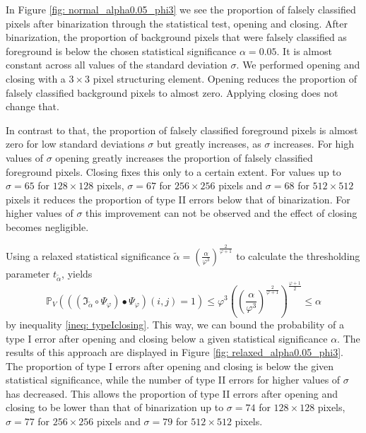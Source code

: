 \documentclass[a4paper,12pt]{article}
\theoremstyle{plain}
\theoremstyle{definition}
\begin{document}
In Figure \ref{fig: normal_alpha0.05_phi3} we see the proportion of falsely classified pixels after binarization through the statistical test, opening and closing. After binarization, the proportion of background pixels that were falsely classified as foreground is below the chosen statistical significance $\alpha = 0.05$. It is almost constant across all values of the standard deviation $\sigma$. We performed opening and closing with a $3 \times 3$ pixel structuring element. Opening reduces the proportion of falsely classified background pixels to almost zero. Applying closing does not change that.

In contrast to that, the proportion of falsely classified foreground pixels is almost zero for low standard deviations $\sigma$ but greatly increases, as $\sigma$ increases. For high values of $\sigma$ opening greatly increases the proportion of falsely classified foreground pixels. Closing fixes this only to a certain extent. For values up to $\sigma = 65$ for $128 \times 128$ pixels, $\sigma = 67$ for $256 \times 256$ pixels and $\sigma = 68$ for $512 \times 512$ pixels it reduces the proportion of type II errors below that of binarization. For higher values of $\sigma$ this improvement can not be observed and the effect of closing becomes negligible.

Using a relaxed statistical significance $\tilde{\alpha} = \left( \frac{\alpha}{\varphi^3} \right)^{\frac{2}{\varphi + 1}}$ to calculate the thresholding parameter $t_{\tilde{\alpha}}$, yields
\begin{equation*}
	\mathbb{P}_V\left( ((\mathfrak{I}_{\tilde{\alpha}} \circ \Psi_\varphi) \bullet \Psi_\varphi)(i, j) = 1 \right) \leq \varphi^3 \left( \left( \frac{\alpha}{\varphi^3} \right)^{\frac{2}{\varphi + 1}} \right)^{\frac{\varphi + 1}{2}} \leq \alpha
\end{equation*}
by inequality \eqref{ineq: typeIclosing}. This way, we can bound the probability of a type I error after opening and closing below a given statistical significance $\alpha$. The results of this approach are displayed in Figure \ref{fig: relaxed_alpha0.05_phi3}. The proportion of type I errors after opening and closing is below the given statistical significance, while the number of type II errors for higher values of $\sigma$ has decreased. This allows the proportion of type II errors after opening and closing to be lower than that of binarization up to $\sigma = 74$ for $128 \times 128$ pixels, $\sigma = 77$ for $256 \times 256$ pixels and $\sigma = 79$ for $512 \times 512$ pixels.
\end{document}
